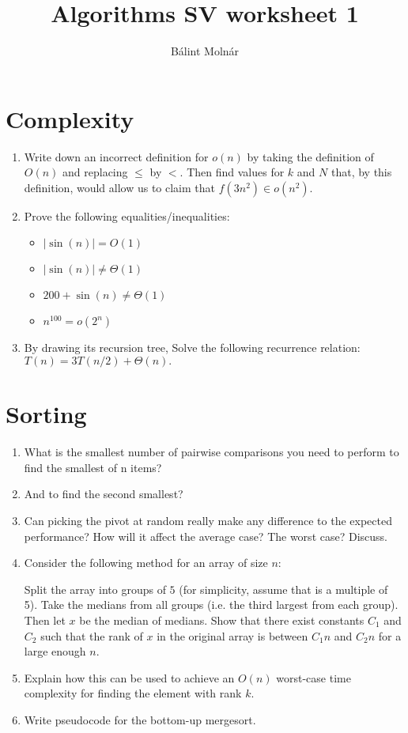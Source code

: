 \documentclass{article}
\title{{Algorithms SV worksheet 1}}
\author{Bálint Molnár}
\begin{document}
\maketitle


\section{Complexity}

\begin{enumerate}
    \item Write down an incorrect definition for $o(n)$ by taking the definition of $O(n)$ and
replacing $\leq$ by $<$. Then find values for $k$ and $N$ that, by this definition, would
allow us to claim that $f (3n^2) \in o(n^2)$.

\item 
Prove the following equalities/inequalities:
\begin{itemize}
    \item $| \sin(n)| = O(1)$
    \item $| \sin(n)| \neq  \Theta(1)$
    \item $ 200 + \sin(n)\neq  \Theta(1)$
    \item $n^{100} = o(2^n)$
\end{itemize}
\item 
By drawing its recursion tree, Solve the following recurrence relation: $T(n)=3T(n/2)+\Theta(n).$

\end{enumerate}

\section{Sorting}

\begin{enumerate}
    \item What is the smallest number of pairwise comparisons you need to perform to
find the smallest of n items?
\item And to find the second smallest?
\item Can picking the pivot at random really make any difference to the
expected performance? How will it affect the average case? The
worst case? Discuss.
\item Consider the following method for an array of size $n$:

Split the array into groups of $5$ (for simplicity, assume that is a multiple of 5). Take the medians from all groups (i.e. the third largest from each group). Then let $x$ be the median of medians. Show that there exist constants $C_1$ and $C_2$ such that the rank of $x$ in the original array is between $C_1n$ and $C_2n$ for a large enough $n$.

\item Explain how this can be used to achieve an $O(n)$ worst-case time complexity for finding the element with rank $k$.
\item Write pseudocode for the bottom-up mergesort.
\end{enumerate}
\end{document}
